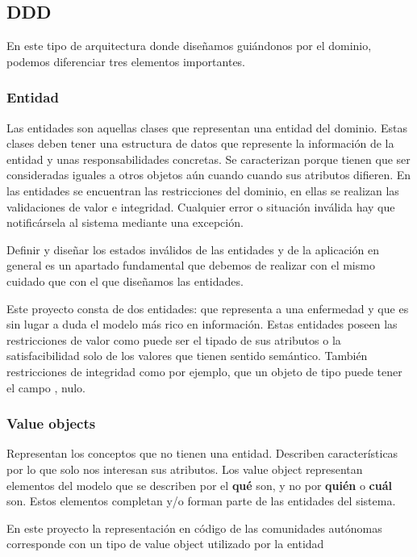 \subsection{DDD}
En este tipo de arquitectura donde diseñamos guiándonos por el dominio, podemos diferenciar tres elementos importantes.

\subsubsection{Entidad}
Las entidades son aquellas clases que representan una entidad del dominio. Estas clases deben tener una estructura de datos que represente la información de la entidad y unas responsabilidades concretas. Se caracterizan porque tienen que ser consideradas iguales a otros objetos aún cuando cuando sus atributos difieren. En las entidades se encuentran las restricciones del dominio, en ellas se realizan las validaciones de valor e integridad. Cualquier error o situación inválida hay que notificársela al sistema mediante una excepción. 

Definir y diseñar los estados inválidos de las entidades y de la aplicación en general es un apartado fundamental que debemos de realizar con el mismo cuidado que con el que diseñamos las entidades.

Este proyecto consta de dos entidades:  que representa a una enfermedad y  que es sin lugar a duda el modelo más rico en información. Estas entidades poseen las restricciones de valor como puede ser el tipado de sus atributos o la satisfacibilidad solo de los valores que tienen sentido semántico. También restricciones de integridad como por ejemplo, que un objeto de tipo  puede tener el campo , nulo.

\subsubsection{Value objects}
Representan los conceptos que no tienen una entidad. Describen características por lo que solo nos interesan sus atributos.
Los value object representan elementos del modelo que se describen por el \textbf{qué} son, y no por \textbf{quién} o \textbf{cuál} son. Estos elementos completan y/o forman parte de las entidades del sistema.

En este proyecto la representación en código de las comunidades autónomas corresponde con un tipo de value object utilizado por la entidad 

